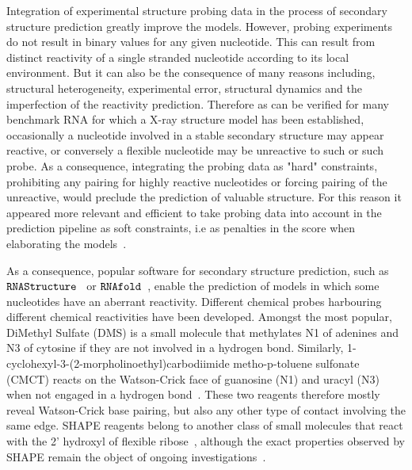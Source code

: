 \documentclass[a4,center,fleqn]{NAR}
\newcommand{\Software}[1]{$\text{\ttfamily #1}$}
\begin{document}
Integration of experimental structure probing data in the process of secondary structure prediction greatly improve the models. However, probing experiments do not result in binary values for any given nucleotide. This can result from distinct reactivity of a single stranded nucleotide according to its local environment. But it can also be the consequence of many reasons including, structural heterogeneity, experimental error, structural dynamics and the imperfection of the reactivity prediction. Therefore as can be verified for many benchmark RNA for which a X-ray structure model has been established, occasionally a nucleotide involved in a stable secondary structure may appear reactive, or conversely a flexible nucleotide may be unreactive to such or such probe. As a consequence, integrating the probing data as "hard" constraints, prohibiting any pairing for highly reactive nucleotides or forcing pairing of the unreactive, would preclude the prediction of valuable structure. For this reason it appeared more relevant and efficient to take probing data into account in the prediction pipeline as soft constraints, i.e as penalties in the score when elaborating the models~\cite{Deigan2009,Washietl2012,Zarringhalam2012}. 

As a consequence, popular software for secondary structure prediction, such as \Software{RNAStructure}~\cite{Mathews2004} or \Software{RNAfold}~\cite{Lorenz2011}, enable the prediction of models in which some nucleotides have an aberrant reactivity. 
Different chemical probes harbouring different chemical reactivities have been developed. Amongst the most popular, DiMethyl Sulfate (DMS) is a small molecule that methylates N1 of adenines and N3 of cytosine if they are not involved in a hydrogen bond. Similarly, 1-cyclohexyl-3-(2-morpholinoethyl)carbodiimide metho-p-toluene sulfonate (CMCT) reacts on the Watson-Crick face of guanosine (N1) and uracyl (N3) when not engaged in a hydrogen bond~\cite{Ehresmann1987,Brunel2000}. These two reagents therefore mostly reveal Watson-Crick base pairing, but also any other type of contact involving the same edge. SHAPE reagents belong to another class of small molecules that react with the 2’ hydroxyl of flexible ribose~\cite{McGinnis2012}, although the exact properties observed by SHAPE remain the object of ongoing investigations~\cite{Hurst2018,Mlynsky2018}. 
\end{document}
